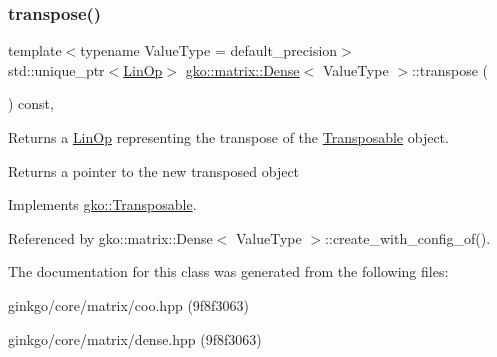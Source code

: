 \subsubsection{\texorpdfstring{transpose()}{transpose()}}
{\footnotesize\ttfamily template$<$typename Value\+Type = default\+\_\+precision$>$ \\
std\+::unique\+\_\+ptr$<$\hyperlink{classgko_1_1LinOp}{Lin\+Op}$>$ \hyperlink{classgko_1_1matrix_1_1Dense}{gko\+::matrix\+::\+Dense}$<$ Value\+Type $>$\+::transpose (\begin{DoxyParamCaption}{ }\end{DoxyParamCaption}) const\hspace{0.3cm}{\ttfamily [override]}, {\ttfamily [virtual]}}



Returns a \hyperlink{classgko_1_1LinOp}{Lin\+Op} representing the transpose of the \hyperlink{classgko_1_1Transposable}{Transposable} object. 

\begin{DoxyReturn}{Returns}
a pointer to the new transposed object 
\end{DoxyReturn}


Implements \hyperlink{classgko_1_1Transposable_a5c6b778b71b47d53e0bda6ccf894d318}{gko\+::\+Transposable}.



Referenced by gko\+::matrix\+::\+Dense$<$ Value\+Type $>$\+::create\+\_\+with\+\_\+config\+\_\+of().



The documentation for this class was generated from the following files\+:\begin{DoxyCompactItemize}
\item 
ginkgo/core/matrix/coo.\+hpp (9f8f3063)\item 
ginkgo/core/matrix/dense.\+hpp (9f8f3063)\end{DoxyCompactItemize}
